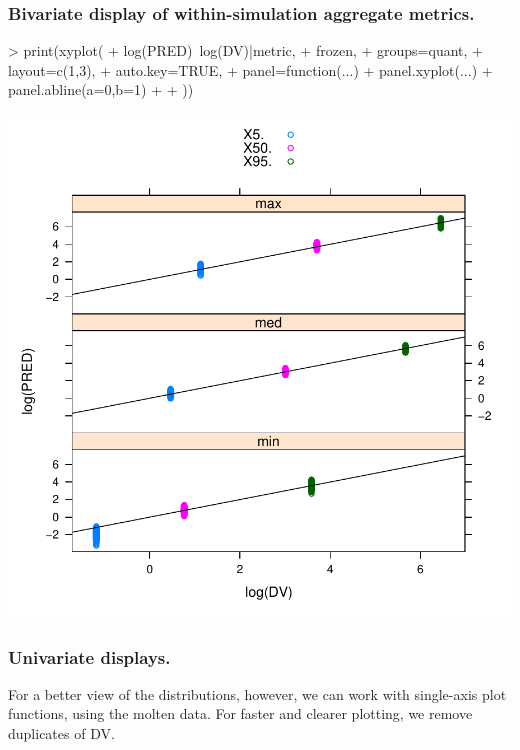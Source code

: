 \subsubsection{Bivariate display of within-simulation aggregate metrics.}
\begin{Schunk}
\begin{Sinput}
> print(xyplot(
+ 	log(PRED)~log(DV)|metric,
+ 	frozen,
+ 	groups=quant,
+ 	layout=c(1,3),
+ 	auto.key=TRUE,
+ 	panel=function(...){
+ 		panel.xyplot(...)
+ 		panel.abline(a=0,b=1)
+ 	}
+ ))
\end{Sinput}
\end{Schunk}
\includegraphics{model1-bivariate}
\subsubsection{Univariate displays.}
For a better view of the distributions, however, we can work with single-axis plot functions,
using the molten data.  For faster and clearer plotting, we remove duplicates of DV.
